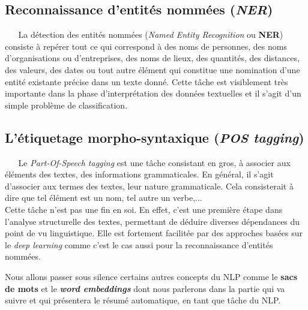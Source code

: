 \subsection{Reconnaissance d'entités nommées (\textit{NER}) \cite{sarkar2019text}}
$ _{} $ $ _{} $ $ _{} $ $ _{} $ $ _{} $La détection des entités nommées (\textit{Named Entity Recognition} ou \textbf{NER}) consiste à repérer tout ce qui correspond à des noms de personnes, des noms d'organisations ou d'entreprises, des noms de lieux, des quantités, des distances, des valeurs, des dates ou tout autre élément qui constitue une nomination d'une entité existante précise dans un texte donné. Cette tâche est visiblement très importante dans la phase d'interprétation des données textuelles et il s'agit d'un simple problème de classification.
\subsection{L'étiquetage morpho-syntaxique (\textit{POS tagging})}
$ _{} $ $ _{} $ $ _{} $ $ _{} $ $ _{} $Le \textit{Part-Of-Speech tagging} est une tâche consistant en gros, à associer aux éléments des textes, des informations grammaticales. En général, il s'agit d'associer aux termes des textes, leur nature grammaticale. Cela consisterait à dire que tel élément est un nom, tel autre un verbe,...\cite{sarkar2019text,kulkarni2019natural}\\
Cette tâche n'est pas une fin en soi. En effet, c'est une première étape dans l'analyse structurelle des textes, permettant de déduire diverses dépendances du point de vu lin\-guis\-ti\-que. Elle est fortement facilitée par des approches basées sur le \textit{deep learning} comme c'est le cas aussi pour la reconnaissance d'entités nommées.

Nous allons passer sous silence certains autres concepts du NLP comme le \textbf{sacs de mots} et le \textbf{\textit{word embeddings}} dont nous parlerons dans la partie qui va suivre et qui présentera le résumé automatique, en tant que tâche du NLP.\newpage
